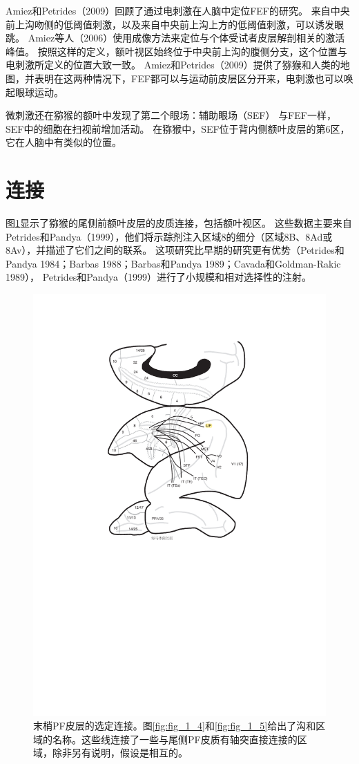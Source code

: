 Amiez和Petrides（2009）回顾了通过电刺激在人脑中定位FEF的研究。
来自中央前上沟吻侧的低阈值刺激，以及来自中央前上沟上方的低阈值刺激，可以诱发眼跳。
Amiez等人（2006）使用成像方法来定位与个体受试者皮层解剖相关的激活峰值。
按照这样的定义，额叶视区始终位于中央前上沟的腹侧分支，这个位置与电刺激所定义的位置大致一致。
Amiez和Petrides（2009）提供了猕猴和人类的地图，并表明在这两种情况下，FEF都可以与运动前皮层区分开来，电刺激也可以唤起眼球运动。


微刺激还在猕猴的额叶中发现了第二个眼场：辅助眼场（SEF） \cite{Schlag & Schlag-Rey 1987}与FEF一样，SEF中的细胞在扫视前增加活动\cite{Hanes et al. 1995}。
在猕猴中，SEF位于背内侧额叶皮层的第6区\cite{Schlag & Schlag-Rey 1987;Olson & Gettner 1999}，它在人脑中有类似的位置\cite{Amiez & Petrides 2009}。



\section{连接}

图\ref{fig:fig_5_2}显示了猕猴的尾侧前额叶皮层的皮质连接，包括额叶视区。
这些数据主要来自Petrides和Pandya（1999），他们将示踪剂注入区域8的细分（区域8B、8Ad或8Av），并描述了它们之间的联系。
这项研究比早期的研究更有优势（Petrides和Pandya 1984；Barbas 1988；Barbas和Pandya 1989；Cavada和Goldman-Rakic 1989）， Petrides和Pandya（1999）进行了小规模和相对选择性的注射。


\begin{figure}
	\centering
	\includegraphics[width=0.7\linewidth]{image_pfc/Fig_5_2}
	\caption{末梢PF皮层的选定连接。图\ref{fig:fig_1_4}和\ref{fig:fig_1_5}给出了沟和区域的名称。这些线连接了一些与尾侧PF皮质有轴突直接连接的区域，除非另有说明，假设是相互的。}
	\label{fig:fig_5_2}
\end{figure}


